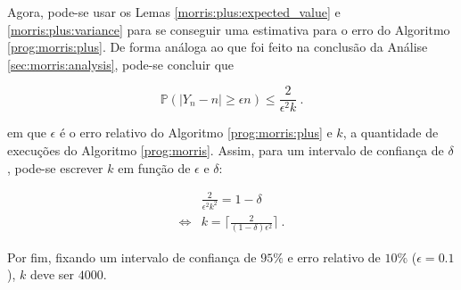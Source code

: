 Agora, pode-se usar os Lemas \ref{morris:plus:expected_value} e \ref{morris:plus:variance} para se conseguir uma estimativa para o 
erro do Algoritmo \ref{prog:morris:plus}. De forma análoga ao que foi feito na conclusão da Análise \ref{sec:morris:analysis}, pode-se 
concluir que

\[ \mathbb{P}(|Y_n - n| \geq \epsilon n ) \leq \frac{2}{\epsilon^2 k} \ . \]

em que $\epsilon$ é o erro relativo do Algoritmo \ref{prog:morris:plus} e $k$, a quantidade de execuções do Algoritmo \ref{prog:morris}.
Assim, para um intervalo de confiança de $\delta$, pode-se escrever $k$ em função de $\epsilon$ e $\delta$:

\begin{align*}
      &\frac{2}{\epsilon^2 k^2} = 1 - \delta \\
  \iff& k = \Bigg\lceil \frac{2}{(1 - \delta) \epsilon^2} \Bigg\rceil \ .
\end{align*}

Por fim, fixando um intervalo de confiança de $95\%$ e erro relativo de $10\%$ ($\epsilon = 0.1$), $k$ deve ser $4000$.  
